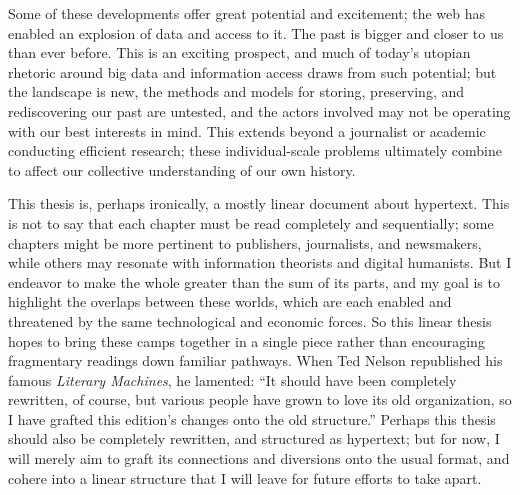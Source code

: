 Some of these developments offer great potential and excitement; the web has enabled an explosion of data and access to it. The past is bigger and closer to us than ever before. This is an exciting prospect, and much of today's utopian rhetoric around big data and information access draws from such potential; but the landscape is new, the methods and models for storing, preserving, and rediscovering our past are untested, and the actors involved may not be operating with our best interests in mind. This extends beyond a journalist or academic conducting efficient research; these individual-scale problems ultimately combine to affect our collective understanding of our own history.

This thesis is, perhaps ironically, a mostly linear document about hypertext. This is not to say that each chapter must be read completely and sequentially; some chapters might be more pertinent to publishers, journalists, and newsmakers, while others may resonate with information theorists and digital humanists. But I endeavor to make the whole greater than the sum of its parts, and my goal is to highlight the overlaps between these worlds, which are each enabled and threatened by the same technological and economic forces. So this linear thesis hopes to bring these camps together in a single piece rather than encouraging fragmentary readings down familiar pathways. When Ted Nelson republished his famous \emph{Literary Machines}, he lamented: ``It should have been completely rewritten, of course, but various people have grown to love its old organization, so I have grafted this edition's changes onto the old structure.''%
Perhaps this thesis should also be completely rewritten, and structured as hypertext; but for now, I will merely aim to graft its connections and diversions onto the usual format, and cohere into a linear structure that I will leave for future efforts to take apart.



